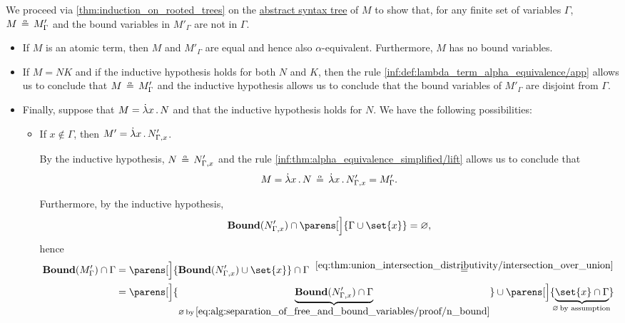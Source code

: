 \begin{defproof}
  We proceed via \cref{thm:induction_on_rooted_trees} on the \hyperref[def:lambda_term_ast]{abstract syntax tree} of \( M \) to show that, for any finite set of variables \( \Gamma \), \( M \aequiv M'_\Gamma \) and the bound variables in \( M'_\Gamma \) are not in \( \Gamma \).

  \begin{itemize}
    \item If \( M \) is an atomic term, then \( M \) and \( M'_\Gamma \) are equal and hence also \( \alpha \)-equivalent. Furthermore, \( M \) has no bound variables.

    \item If \( M = NK \) and if the inductive hypothesis holds for both \( N \) and \( K \), then the rule \ref{inf:def:lambda_term_alpha_equivalence/app} allows us to conclude that \( M \aequiv M'_\Gamma \) and the inductive hypothesis allows us to conclude that the bound variables of \( M'_\Gamma \) are disjoint from \( \Gamma \).

    \item Finally, suppose that \( M = \qabs x N \) and that the inductive hypothesis holds for \( N \). We have the following possibilities:
    \begin{itemize}
      \item If \( x \not\in \Gamma \), then \( M' = \qabs x N'_{\Gamma,x} \).

      By the inductive hypothesis, \( N \aequiv N'_{\Gamma,x} \) and the rule \ref{inf:thm:alpha_equivalence_simplified/lift} allows us to conclude that
      \begin{equation*}
        M = \qabs x N \aequiv \qabs x N'_{\Gamma,x} = M'_\Gamma.
      \end{equation*}

      Furthermore, by the inductive hypothesis,
      \begin{equation}\label{eq:alg:separation_of_free_and_bound_variables/proof/n_bound}
        \op*{Bound}(N'_{\Gamma,x}) \cap \parens[\Big]{ \Gamma \cup \set{ x } } = \varnothing,
      \end{equation}
      hence
      \begin{align*}
        \op*{Bound}(M'_\Gamma) \cap \Gamma
        &=
        \parens[\Big]{ \op*{Bound}(N'_{\Gamma,x}) \cup \set{ x } } \cap \Gamma
        \reloset {\eqref{eq:thm:union_intersection_distributivity/intersection_over_union}} = \\ &=
        \parens[\Big]{ \underbrace{\op*{Bound}(N'_{\Gamma,x}) \cap \Gamma }_{\varnothing \T*{by} \eqref{eq:alg:separation_of_free_and_bound_variables/proof/n_bound}} } \cup \parens[\Big]{ \underbrace{\set{ x } \cap \Gamma}_{\mathclap{\varnothing \T*{by assumption}}} }
      \end{align*}


\end{itemize}
\end{itemize}
\end{defproof}
